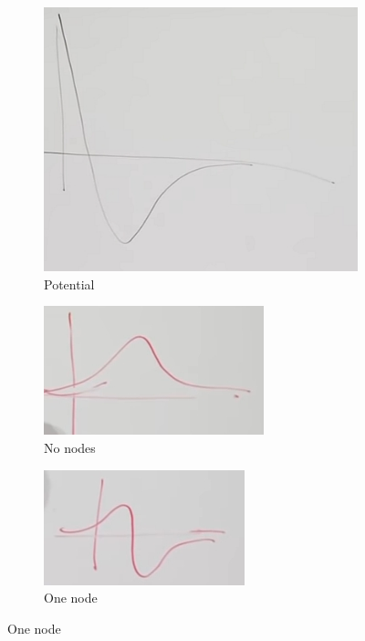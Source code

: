 \documentclass[]{article}
\begin{document}
\begin{figure}[H]
	\caption{Solving (\ref{eq:schroedinger:central})}
	\begin{subfigure}[t]{0.45\textwidth}
		\caption{Potential}\label{fig:aqm-3-central-potential}
		\includegraphics[width=\textwidth]{aqm-3-central-potential}
	\end{subfigure}
	\begin{subfigure}[t]{0.45\textwidth}
		\caption{No nodes}\label{fig:aqm-3-central-0node}
		\includegraphics[width=\textwidth]{aqm-3-central-0node}
	\end{subfigure}
	\begin{subfigure}[t]{0.45\textwidth}
		\caption{One node}\label{fig:aqm-3-central-1node}
		\includegraphics[width=\textwidth]{aqm-3-central-1node}

\end{subfigure}
\end{figure}
\end{document}
